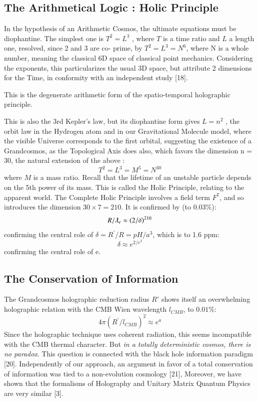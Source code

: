 \documentclass[twoside,draft]{article}
\begin{document}
\begin{sloppypar}
{\subsection{The Arithmetical Logic : Holic Principle}

In the hypothesis of an Arithmetic Cosmos, the ultimate equations must be diophantine. The
simplest one is $T^{2} = L^{3}$ , where $T$ is a time ratio and $L$ a length one, resolved, since 2 and 3 are co-
prime, by $T^{2} = L^{3} = N^{6}$, where N is a whole number, meaning the classical 6D space of classical point mechanics. Considering the exponents, this particularizes the usual 3D space, but attribute 2 dimensions for the Time, in conformity with an independent study [18].

This is the degenerate arithmetic form of the spatio-temporal holographic principle.

This is also the 3rd Kepler's law, but its diophantine form gives $L = n^{2}$ , the orbit law in the Hydrogen atom and in our
Gravitational Molecule model, where the visible Universe corresponds to the first orbital,
suggesting the existence of a Grandcosmos, as the Topological Axis does also, which favors the
dimension n = 30, the natural extension of the above :
\begin{equation}
T^{2} = L^{3} = M^{5} = N^{30}
\end{equation}
where $M$ is a mass ratio. Recall that the lifetime of an unstable particle depends on the 5th power of its mass. This is called the Holic Principle, relating to the apparent world. The Complete Holic
Principle involves a field term $F^{7}$, and so introduces the dimension $30 \times 7 = 210$. It is confirmed by (to 0.03\%):
\begin{equation}
R/\lambdabar_e \approx (2/\delta)^{210}
\end{equation}
confirming the central role of $\delta = R^{\prime}/R = pH/a^3$, which is to 1.6 ppm:
\begin{equation}
\delta \approx e^{2/e^2} 
\end{equation}
confirming the central role of e.


\subsection{The Conservation of Information}

The Grandcosmos holographic reduction radius $R\prime$ shows itself an overwhelming holographic
relation with the CMB Wien wavelength $l_{CMB}$, to $0.01\%$:
\begin{equation}
4\pi(R^{\prime}/l_{CMB})^{2} \approx e^{a}
\end{equation}
Since the holographic technique uses coherent radiation, this seems incompatible with the CMB
thermal character. But \textit{in a totally deterministic cosmos, there is no paradox}. This question is
connected with the black hole information paradigm [20]. Independently of our approach, an
argument in favor of a total conservation of information was tied to a non-evolution cosmology
[21], Moreover, we have shown that the formalisms of Holography and Unitary Matrix Quantum
Physics are very similar [3]. 

}
\end{sloppypar}
\end{document}
